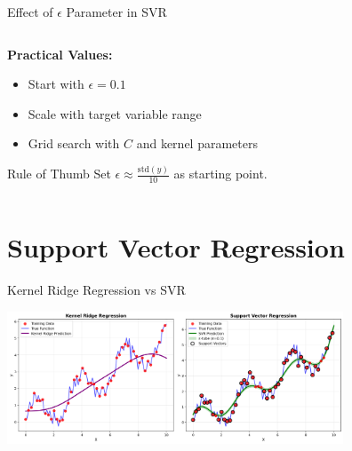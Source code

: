 \documentclass[8pt,aspectratio=1610]{beamer}
\begin{document}
\begin{frame}{Effect of $\epsilon$ Parameter in SVR}
\begin{columns}[t]
\begin{column}{0.48\textwidth}
\vspace{0.3cm}
\textbf{Practical Values:}
\begin{itemize}
\setlength{\itemsep}{1pt}
\item Start with $\epsilon = 0.1$
\item Scale with target variable range
\item Grid search with $C$ and kernel parameters
\end{itemize}

\vspace{0.3cm}
\begin{alertblock}{Rule of Thumb}
Set $\epsilon \approx \frac{\text{std}(y)}{10}$ as starting point.
\end{alertblock}
\end{column}
\end{columns}
\end{frame}

\section{Support Vector Regression}

\begin{frame}{Kernel Ridge Regression vs SVR}
\begin{center}
\includegraphics[width=0.75\textwidth]{../figures/kernel_ridge_vs_svr.png}
\end{center}
\end{frame}
\end{document}
